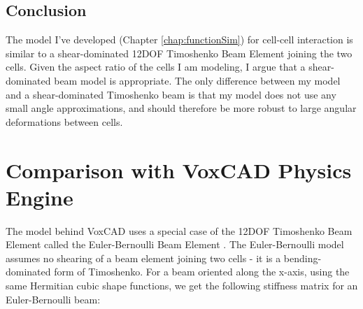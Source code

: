 {%
%

\subsection{Conclusion}

The model I've developed (Chapter \ref{chap:functionSim}) for cell-cell interaction is similar to a shear-dominated 12DOF Timoshenko Beam Element joining the two cells.  Given the aspect ratio of the cells I am modeling, I argue that a shear-dominated beam model is appropriate.  The only difference between my model and a shear-dominated Timoshenko beam is that my model does not use any small angle approximations, and should therefore be more robust to large angular deformations between cells.

\section{Comparison with VoxCAD Physics Engine}

The model behind VoxCAD uses a special case of the 12DOF Timoshenko Beam Element called the Euler-Bernoulli Beam Element \cite{Hiller2014a}.  The Euler-Bernoulli model assumes no shearing of a beam element joining two cells - it is a bending-dominated form of Timoshenko.  For a beam oriented along the x-axis, using the same Hermitian cubic shape functions, we get the following stiffness matrix for an Euler-Bernoulli beam:

}
